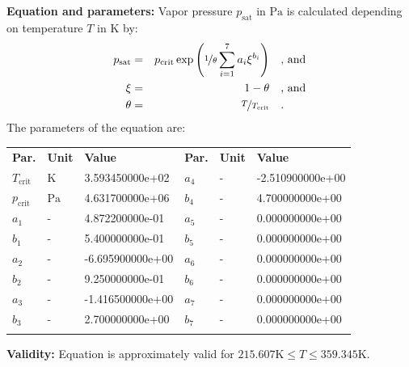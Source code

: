 \textbf{Equation and parameters:}
\newline
%
Vapor pressure $p_\mathrm{sat}$ in $\si{\pascal}$ is calculated depending on temperature $T$ in $\si{\kelvin}$ by:
%
\begin{equation*}
\begin{split}
p_\mathrm{sat} &=& p_\mathrm{crit} \exp \left( \nicefrac{1}{\theta} \sum_{i=1}^{7} a_i \xi^{b_i} \right) & \quad\text{, and} \\
\xi &=& 1 - \theta & \quad\text{, and} \\
\theta &=& \nicefrac{T}{T_\mathrm{crit}} & \quad\text{.}
\end{split}
\end{equation*}
%
The parameters of the equation are:
%
\begin{longtable}[l]{lll|lll}
\toprule
\addlinespace
\textbf{Par.} & \textbf{Unit} & \textbf{Value} &	\textbf{Par.} & \textbf{Unit} & \textbf{Value} \\
\addlinespace
\midrule
\endhead

\bottomrule
\endfoot
\bottomrule
\endlastfoot
\addlinespace

$T_\mathrm{crit}$ & $\si{\kelvin}$ & 3.593450000e+02 & $a_4$ & - & -2.510900000e+00 \\
$p_\mathrm{crit}$ & $\si{\pascal}$ & 4.631700000e+06 & $b_4$ & - & 4.700000000e+00 \\
$a_1$ & - & 4.872200000e-01 & $a_5$ & - & 0.000000000e+00 \\
$b_1$ & - & 5.400000000e-01 & $b_5$ & - & 0.000000000e+00 \\
$a_2$ & - & -6.695900000e+00 & $a_6$ & - & 0.000000000e+00 \\
$b_2$ & - & 9.250000000e-01 & $b_6$ & - & 0.000000000e+00 \\
$a_3$ & - & -1.416500000e+00 & $a_7$ & - & 0.000000000e+00 \\
$b_3$ & - & 2.700000000e+00 & $b_7$ & - & 0.000000000e+00 \\

\addlinespace\end{longtable}

\textbf{Validity:}
\newline
Equation is approximately valid for $215.607 \si{\kelvin} \leq T \leq 359.345 \si{\kelvin}$.
\newline

